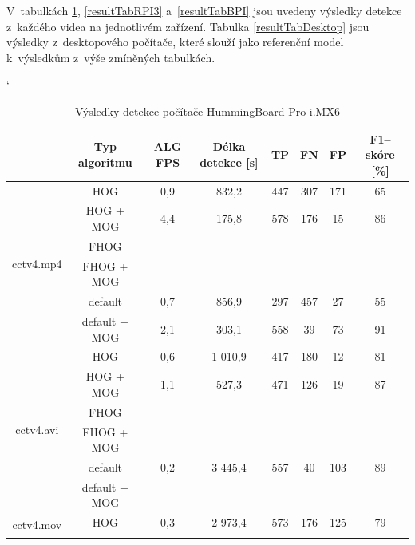 V~tabulkách \ref{resultTabIMX}, \ref{resultTabRPI3} a~\ref{resultTabBPI} jsou uvedeny výsledky detekce z~každého videa na jednotlivém zařízení. Tabulka \ref{resultTabDesktop} jsou výsledky z~desktopového počítače, které slouží jako referenční model k~výsledkům z~výše zmíněných tabulkách.  
\begin{table}[H]
\catcode`
\centering
\caption{Výsledky detekce počítače HummingBoard Pro i.MX6 }
\label{resultTabIMX}
\begin{tabular}{|c|c|c|c|c|c|c|c|}
\hline
                         & Typ algoritmu   	& ALG FPS & Délka detekce [s] & TP  & FN  & FP  & F1--skóre [\%] \\ \hline
\multirow{6}{*}{cctv4.mp4} & HOG        	&   0,9   &      832,2        & 447 & 307 & 171 &    65          \\ \cline{2-8} 
                         & HOG + MOG  		&   4,4   &      175,8        & 578 & 176 & 15  &    86          \\ \cline{2-8}  
                         & FHOG       		&         &                   &     &     &     &                \\ \cline{2-8}  
                         & FHOG + MOG 		&         &                   &     &     &     &                \\ \cline{2-8}  
                         & default	 		&   0,7   &      856,9        & 297 & 457 & 27  &    55          \\ \cline{2-8}  
                         & default + MOG	&   2,1   &      303,1        & 558 & 39  & 73  &    91          \\ \hline\hline 
\multirow{6}{*}{cctv4.avi} & HOG        	&   0,6   &    1 010,9        & 417 & 180 & 12  &    81          \\ \cline{2-8} 
                         & HOG + MOG  		&   1,1   &      527,3        & 471 & 126 & 19  &    87          \\ \cline{2-8}  
                         & FHOG       		&      &              &  &  &   &          \\ \cline{2-8} 
                         & FHOG + MOG 		&         &                   &     &     &     &          \\ \cline{2-8} 
                         &  default 		&   0,2   &      3 445,4      & 557 & 40  & 103 &    89    \\ \cline{2-8}  
                         & default + MOG	&         &                   &     &     &     &          \\ \hline \hline
\multirow{6}{*}{cctv4.mov} & HOG        	&   0,3   &      2 973,4      & 573 & 176 & 125 &    79    \\ \cline{2-8} 

\end{tabular}
\end{table}
